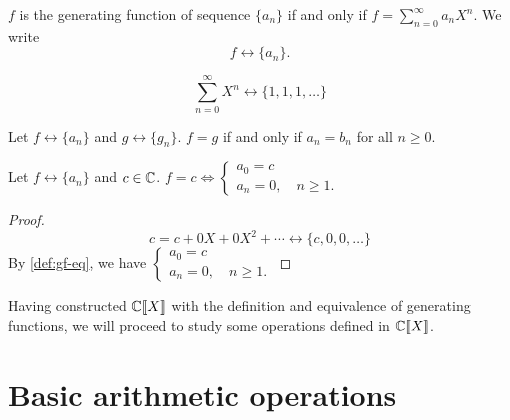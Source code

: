 \documentclass[a4paper, 12pt]{report}
\begin{document}
\begin{defn}\label{def:gf-seq}
 $f$ is the generating function of sequence $\{a_n\}$ if and only if $f = \sum_{n = 0}^{\infty} a_n X^n$. We write 
 \[f \longleftrightarrow \{a_n\}.\]
\end{defn}
\begin{ex*}\label{ex:gf-111}
$$\sum_{n = 0}^\infty X^n \longleftrightarrow \{1, 1, 1, \dots\}$$
\end{ex*}

\begin{defn}\label{def:gf-eq}
Let $f \longleftrightarrow \{a_n\}$ and $g \longleftrightarrow \{g_n\}$. $f = g$ if and only if $a_n = b_n$ for all $n \geq 0$.
\end{defn}

\begin{lem}\label{lem:gf-id-c}
Let $f \longleftrightarrow \{a_n\}$ and $c \in \mathbb{C}$. $f = c \iff \begin{cases}
    a_0 = c\\
    a_n = 0, \quad n \geq 1.
\end{cases}$
\end{lem}
\begin{proof}\label{proof:gf-id-c}
\[c = c + 0X + 0X^2 + \cdots \longleftrightarrow \{c, 0, 0, \dots\}\]
By \cref{def:gf-eq}, we have $\begin{cases}
a_0 = c\\
a_n = 0, \quad n \geq 1.
\end{cases}$
\end{proof}

Having constructed $\mathbb{C}\llbracket X \rrbracket$ with the definition and equivalence of generating functions, we will proceed to study some operations defined in $\mathbb{C}\llbracket X \rrbracket$.

\section{Basic arithmetic operations}
\end{document}
